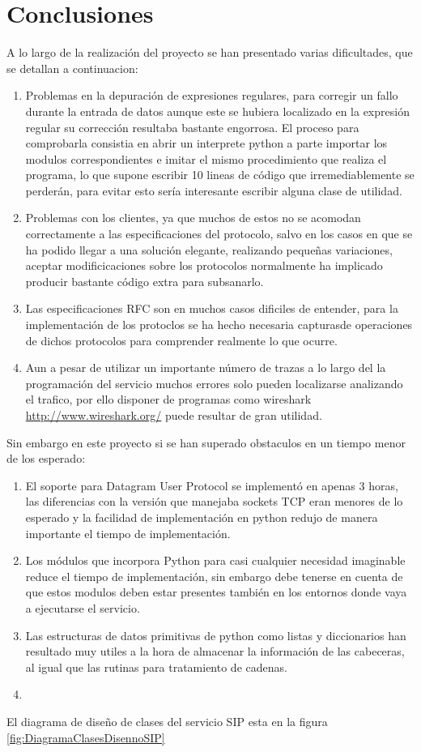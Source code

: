 \documentclass[a4paper,spanish,12pt]{book}
\begin{document}
\section{Conclusiones}
A lo largo de la realización del proyecto se han presentado varias dificultades, que se detallan a continuacion:
\begin{enumerate}
	\item Problemas en la depuración de expresiones regulares, para corregir un fallo durante la entrada de datos aunque este se hubiera localizado en la expresión regular su corrección resultaba bastante engorrosa. El proceso para comprobarla consistia en abrir un interprete python a parte importar los modulos correspondientes e imitar el mismo procedimiento que realiza el programa, lo que supone escribir 10 lineas de código que irremediablemente se perderán, para evitar esto sería interesante escribir alguna clase de utilidad.
	\item Problemas con los clientes, ya que muchos de estos no se acomodan correctamente a las especificaciones del protocolo, salvo en los casos en que se ha podido llegar a una solución elegante, realizando pequeñas variaciones, aceptar modificicaciones sobre los protocolos normalmente ha implicado producir bastante código extra para subsanarlo.
	\item Las especificaciones RFC son en muchos casos dificiles de entender, para la implementación de los protoclos se ha hecho necesaria capturasde operaciones de dichos protocolos para comprender realmente lo que ocurre.
	\item Aun a pesar de utilizar un importante número de trazas a lo largo del la programación del servicio muchos errores solo pueden localizarse analizando el trafico, por ello disponer de programas como wireshark \url{http://www.wireshark.org/} puede resultar de gran utilidad.
\end{enumerate}
Sin embargo en este proyecto si se han superado obstaculos en un tiempo menor de los esperado:
\begin{enumerate}
	\item El soporte para Datagram User Protocol se implementó en apenas 3 horas, las diferencias con la versión que manejaba sockets TCP eran menores de lo esperado y la facilidad de implementación en python redujo de manera importante el tiempo de implementación.
	\item Los módulos que incorpora Python para casi cualquier necesidad imaginable reduce el tiempo de implementación, sin embargo debe tenerse en cuenta de que estos modulos deben estar presentes tambi\'en en los entornos donde vaya a ejecutarse el servicio.
	\item Las estructuras de datos primitivas de python como listas y diccionarios han resultado muy utiles a la hora de almacenar la información de las cabeceras, al igual que las rutinas para tratamiento de cadenas.
	\item 
\end{enumerate}
El diagrama de diseño de clases del servicio SIP esta en la figura \ref{fig:DiagramaClasesDisennoSIP}
\end{document}
